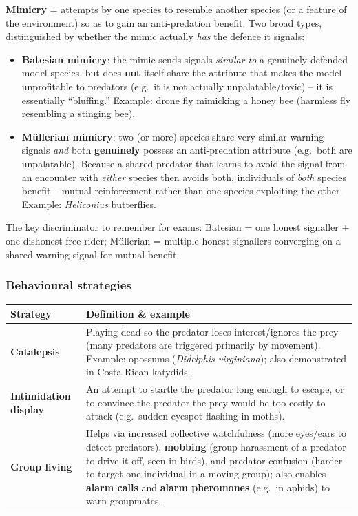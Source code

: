 \documentclass[11pt,a4paper]{article}
\begin{document}
\begin{keybox}[title=Mimicry -- two types (key exam distinction)]
\textbf{Mimicry} = attempts by one species to resemble another species (or a feature of the environment) so as to gain an anti-predation benefit. Two broad types, distinguished by whether the mimic actually \emph{has} the defence it signals:
\begin{itemize}[leftmargin=*]
\item \textbf{Batesian mimicry}: the mimic sends signals \emph{similar to} a genuinely defended model species, but does \textbf{not} itself share the attribute that makes the model unprofitable to predators (e.g.\ it is not actually unpalatable/toxic) -- it is essentially ``bluffing.'' Example: drone fly mimicking a honey bee (harmless fly resembling a stinging bee).
\item \textbf{M\"ullerian mimicry}: two (or more) species share very similar warning signals \emph{and} both \textbf{genuinely} possess an anti-predation attribute (e.g.\ both are unpalatable). Because a shared predator that learns to avoid the signal from an encounter with \emph{either} species then avoids both, individuals of \emph{both} species benefit -- mutual reinforcement rather than one species exploiting the other. Example: \textit{Heliconius} butterflies.
\end{itemize}
The key discriminator to remember for exams: Batesian = one honest signaller $+$ one dishonest free-rider; M\"ullerian = multiple honest signallers converging on a shared warning signal for mutual benefit.
\end{keybox}

\subsubsection*{Behavioural strategies}
\begin{center}
\begin{tabularx}{\textwidth}{@{}l X@{}}
\toprule
\textbf{Strategy} & \textbf{Definition \& example} \\
\midrule
\textbf{Catalepsis} & Playing dead so the predator loses interest/ignores the prey (many predators are triggered primarily by movement). Example: opossums (\textit{Didelphis virginiana}); also demonstrated in Costa Rican katydids. \\
\textbf{Intimidation display} & An attempt to startle the predator long enough to escape, or to convince the predator the prey would be too costly to attack (e.g.\ sudden eyespot flashing in moths). \\
\textbf{Group living} & Helps via increased collective watchfulness (more eyes/ears to detect predators), \textbf{mobbing} (group harassment of a predator to drive it off, seen in birds), and predator confusion (harder to target one individual in a moving group); also enables \textbf{alarm calls} and \textbf{alarm pheromones} (e.g.\ in aphids) to warn groupmates. \\
\bottomrule
\end{tabularx}
\end{center}
\end{document}
